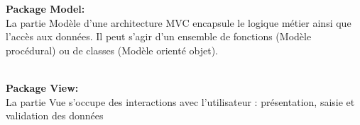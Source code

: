 \documentclass[a4paper]{report}
\begin{document}
\begin{spacing}{2}
\begin{minipage}{\linewidth}
	\label{f11}%
\end{minipage}
\textbf{Package Model:}\\
La partie Modèle d'une architecture MVC encapsule le logique métier  ainsi que l'accès aux données. Il peut s'agir d'un ensemble de fonctions (Modèle procédural) ou de classes (Modèle orienté objet).\\
\begin{minipage}{\linewidth}
	\label{f9}%
\end{minipage}\\
\textbf{Package View:}\\
La partie Vue s'occupe des interactions avec l'utilisateur : présentation, saisie et validation des données\\
\begin{minipage}{\linewidth}
	\label{f10}%
\end{minipage}\\



\end{spacing}
\end{document}
